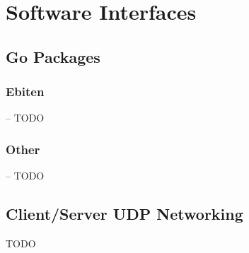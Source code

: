 \section{Software Interfaces} \label{sec:softwareinterfaces}


\subsection{Go Packages}
\subsubsection{Ebiten} -- TODO
\subsubsection{Other} -- TODO

\subsection{Client/Server UDP Networking}
TODO
